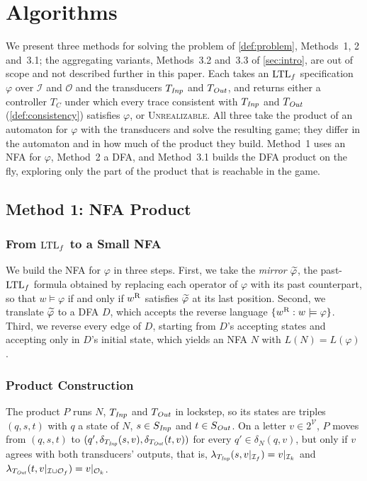 \section{Algorithms}\label{sec:algorithms}


We present three methods for solving the problem of \cref{def:problem}, Methods~1, 2 and~3.1; the aggregating variants, Methods~3.2 and~3.3 of \cref{sec:intro}, are out of scope and not described further in this paper.
Each takes an $\text{LTL}_f$ specification $\varphi$ over $\mathcal{I}$ and $\mathcal{O}$ and the transducers $T_{\mathit{Inp}}$ and $T_{\mathit{Out}}$, and returns either a controller $T_C$ under which every trace consistent with $T_{\mathit{Inp}}$ and $T_{\mathit{Out}}$ (\cref{def:consistency}) satisfies $\varphi$, or \textsc{Unrealizable}.
All three take the product of an automaton for $\varphi$ with the transducers and solve the resulting game; they differ in the automaton and in how much of the product they build.
Method~1 uses an NFA for $\varphi$, Method~2 a DFA, and Method~3.1 builds the DFA product on the fly, exploring only the part of the product that is reachable in the game.

\subsection{Method 1: NFA Product}\label{sec:nfa}
\subsubsection{From \texorpdfstring{$\text{LTL}_f$}{LTLf} to a Small NFA}
We build the NFA for $\varphi$ in three steps.
First, we take the \emph{mirror} $\widetilde{\varphi}$, the past-$\text{LTL}_f$ formula obtained by replacing each operator of $\varphi$ with its past counterpart, so that $w \models \varphi$ if and only if $w^{\mathrm{R}}$ satisfies $\widetilde{\varphi}$ at its last position.
Second, we translate $\widetilde{\varphi}$ to a DFA $D$, which accepts the reverse language $\{w^{\mathrm{R}} : w \models \varphi\}$.
Third, we reverse every edge of $D$, starting from $D$'s accepting states and accepting only in $D$'s initial state, which yields an NFA $N$ with $L(N) = L(\varphi)$.

\subsubsection{Product Construction}
The product $P$ runs $N$, $T_{\mathit{Inp}}$ and $T_{\mathit{Out}}$ in lockstep, so its states are triples $(q, s, t)$ with $q$ a state of $N$, $s \in S_{\mathit{Inp}}$ and $t \in S_{\mathit{Out}}$.
On a letter $v \in 2^{\mathcal{V}}$, $P$ moves from $(q, s, t)$ to $(q', \delta_{T_{\mathit{Inp}}}(s, v), \delta_{T_{\mathit{Out}}}(t, v))$ for every $q' \in \delta_N(q, v)$, but only if $v$ agrees with both transducers' outputs, that is, $\lambda_{T_{\mathit{Inp}}}(s, v|_{\mathcal{I}_{f}}) = v|_{\mathcal{I}_{k}}$ and $\lambda_{T_{\mathit{Out}}}(t, v|_{\mathcal{I} \cup \mathcal{O}_{f}}) = v|_{\mathcal{O}_{k}}$.

